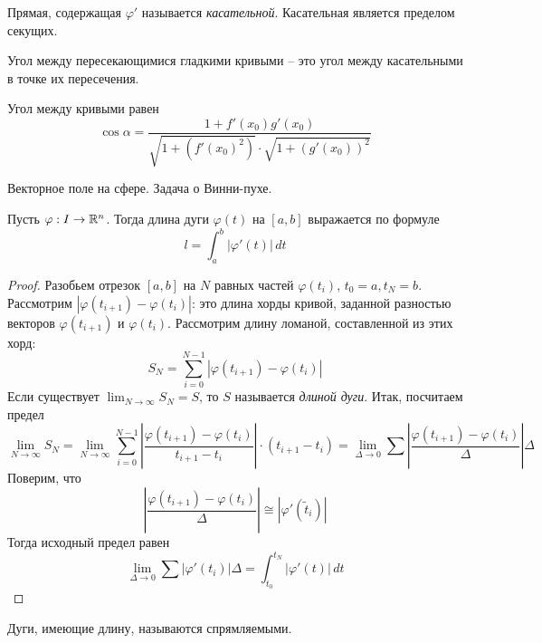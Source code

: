 \begin{Def}
	Прямая, содержащая $\varphi'$ называется \textit{касательной}. Касательная является пределом секущих.
\end{Def}

\begin{Def}
	Угол между пересекающимися гладкими кривыми -- это угол между касательными в точке их пересечения.
\end{Def}

\begin{Rem}
	Угол между кривыми равен
	\[\cos \alpha = \frac{1 + f'(x_0) g'(x_0)}{\sqrt{1 + (f'(x_0)^2)} \cdot \sqrt{1 + (g'(x_0))^2}}\]
\end{Rem}

\begin{Rem}
	Векторное поле на сфере. Задача о Винни-пухе.
\end{Rem}


\begin{figure}[H]
	\centering
	\def\svgwidth{.5\columnwidth}
	
\end{figure}

\begin{Thm}
	Пусть $\varphi : I \to \mathbb{R}^n$. Тогда длина дуги $\varphi(t)$ на $[a, b]$ выражается по формуле
	\[l = \int_{a}^{b} |\varphi'(t)|\,dt\]
\end{Thm}

\begin{proof}
	Разобьем отрезок $[a, b]$ на $N$ равных частей $\varphi(t_i)$, $t_0 = a, t_N = b$.
	Рассмотрим $|\varphi(t_{i + 1}) - \varphi(t_i)|$: это длина хорды кривой, заданной разностью векторов $\varphi(t_{i + 1})$ и $\varphi(t_i)$.
	Рассмотрим длину ломаной, составленной из этих хорд:
	\[S_N = \sum_{i=0}^{N - 1} |\varphi(t_{i + 1}) - \varphi(t_i)|\]
	Если существует $\lim_{N \to \infty} S_N = S$, то $S$ называется \textit{длиной дуги}. Итак, посчитаем предел
	\[\lim_{N \to \infty} S_N = \lim_{N \to \infty} \sum_{i=0}^{N - 1} \left| \frac{\varphi(t_{i + 1}) - \varphi(t_i)}{t_{i + 1} - t_i}\right| \cdot (t_{i + 1} - t_i) = \lim_{\Delta \to 0} \sum\left| \frac{\varphi(t_{i + 1}) - \varphi(t_i)}{\Delta}\right| \Delta\]
	Поверим, что 
	\[\left|\frac{\varphi(t_{i + 1}) - \varphi(t_i)}{\Delta}\right| \cong |\varphi'(\widetilde{t}_i)|\]
	Тогда исходный предел равен
	\[\lim_{\Delta \to 0} \sum |\varphi'(t_i)|\Delta = \int_{t_0}^{t_N} |\varphi'(t)|\,dt\]  
\end{proof}

\begin{Def}
	Дуги, имеющие длину, называются спрямляемыми.
\end{Def}

